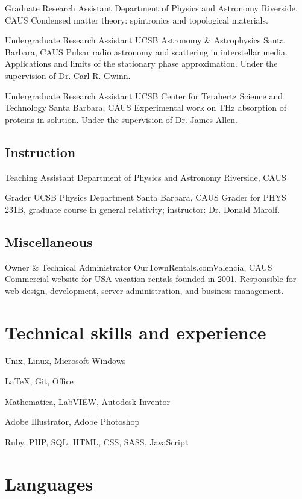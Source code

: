 \documentclass[12pt,letter]{moderncv}
\begin{document}
    {Graduate Research Assistant}
    {Department of Physics and Astronomy}
    {Riverside, CA}{US}
    {Condensed matter theory: spintronics and topological materials.}

    {Undergraduate Research Assistant}
    {UCSB Astronomy \& Astrophysics}
    {Santa Barbara, CA}{US}
    {Pulsar radio astronomy and scattering in interstellar media.
      Applications and limits of the stationary phase approximation.
      Under the supervision of Dr. Carl R. Gwinn.}

    {Undergraduate Research Assistant}
    {UCSB Center for Terahertz Science and Technology}
    {Santa Barbara, CA}{US}
    {Experimental work on THz absorption of proteins in solution.
      Under the supervision  of Dr. James Allen.}

  \subsection{Instruction}

    {Teaching Assistant}
    {Department of Physics and Astronomy}
    {Riverside, CA}{US}{}

    {Grader}
    {UCSB Physics Department}
    {Santa Barbara, CA}{US}
    {Grader for PHYS 231B, graduate course in general relativity; instructor: Dr. Donald Marolf.}

  \subsection{Miscellaneous}

    {Owner \& Technical Administrator}
    {OurTownRentals.com}{Valencia, CA}{US}
    {Commercial website for USA vacation rentals founded in 2001.
      Responsible for web design, development, server administration, and business management.}

  \section{Technical skills and experience}

    {Unix, Linux, Microsoft Windows}

    {\LaTeX, Git, Office}

    {Mathematica, LabVIEW, Autodesk Inventor}

    {Adobe Illustrator, Adobe Photoshop}

    {Ruby, PHP, SQL, HTML, CSS, SASS, JavaScript}

  \section{Languages}

\end{document}
